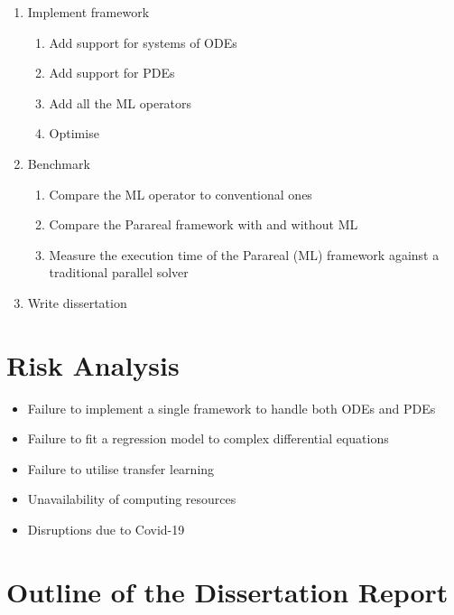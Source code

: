 \documentclass{article}
\begin{document}
\begin{enumerate}
    \item Implement framework
        \begin{enumerate}
        	\item Add support for systems of ODEs
        	\item Add support for PDEs
        	\item Add all the ML operators
        	\item Optimise
        \end{enumerate}
    \item Benchmark
        \begin{enumerate}
        	\item Compare the ML operator to conventional ones
        	\item Compare the Parareal framework with and without ML
        	\item Measure the execution time of the Parareal (ML) framework against a traditional parallel solver
        \end{enumerate}
    \item Write dissertation
\end{enumerate}

\section{Risk Analysis}

\begin{itemize}
    \item Failure to implement a single framework to handle both ODEs and PDEs
    \item Failure to fit a regression model to complex differential equations
    \item Failure to utilise transfer learning
    \item Unavailability of computing resources
    \item Disruptions due to Covid-19
\end{itemize}

\section{Outline of the Dissertation Report}
\end{document}
